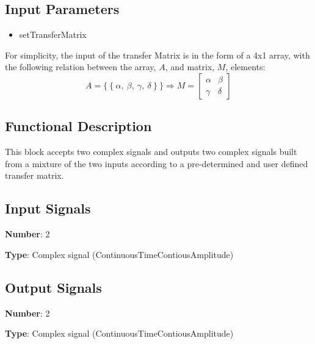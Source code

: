 \documentclass[../../sdf/tex/BPSK_system.tex]{subfiles}
\date{}
\begin{document}
\onlyinsubfile{\maketitle}

\subsection*{Input Parameters}

\begin{multicols}{2}
	\begin{itemize}
		\item setTransferMatrix
	\end{itemize}
\end{multicols}

For simplicity, the input of the transfer Matrix is in the form of a 4x1 array, with the following relation between the array, $A$, and matrix, $M$, elements:
\begin{equation}
A=\{~\{~\alpha,~\beta,~\gamma,~\delta~\}~\}\Rightarrow
M=
\begin{bmatrix}
\alpha & \beta \\
\gamma & \delta
\end{bmatrix}
\end{equation}

\subsection*{Functional Description}

This block accepts two complex signals and outputs two complex signals built from a mixture of the two inputs according to a pre-determined and user defined transfer matrix.


\subsection*{Input Signals}

\textbf{Number}: 2

\textbf{Type}: Complex signal (ContinuousTimeContiousAmplitude)

\subsection*{Output Signals}

\textbf{Number}: 2

\textbf{Type}: Complex signal (ContinuousTimeContiousAmplitude)
\end{document}
